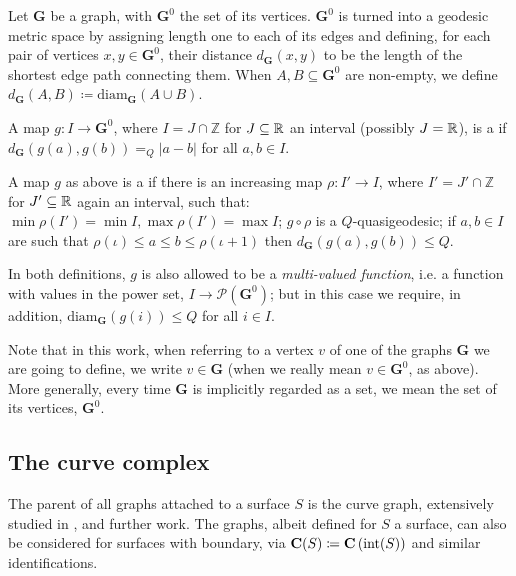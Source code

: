 Let $\mathbf G$ be a graph, with $\mathbf G^0$ the set of its vertices. $\mathbf G^0$ is turned into a geodesic metric space by assigning length one to each of its edges and defining, for each pair of vertices $x,y\in \mathbf G^0$, their distance $d_{\mathbf G}(x,y)$ to be the length of the shortest edge path connecting them. When $A,B \subseteq \mathbf G^0$ are non-empty, we define $d_{\mathbf G}(A,B)\coloneqq\mathrm{diam}_{\mathbf G} (A\cup B)$.

A map $g:I\rightarrow\mathbf G^0$, where $I=J\cap\mathbb Z$ for $J\subseteq \mathbb R$ an interval (possibly $J=\mathbb R$), is a  if $d_{\mathbf G}(g(a),g(b))=_Q |a-b|$ for all $a,b\in I$.

A map $g$ as above is a  if there is an increasing map $\rho:I'\rightarrow I$, where $I'=J'\cap \mathbb Z$ for $J'\subseteq \mathbb R$ again an interval, such that: $\min \rho(I')=\min I,\max \rho(I')=\max I$; $g\circ \rho$ is a $Q$-quasigeodesic; if $a,b\in I$ are such that $\rho(\iota)\leq a\leq b\leq \rho(\iota+1)$ then $d_{\mathbf G}(g(a),g(b))\leq Q$.

In both definitions, $g$ is also allowed to be a \emph{multi-valued function}, i.e. a function with values in the power set, $I\rightarrow \mathcal P(\mathbf G^0)$; but in this case we require, in addition, $\mathrm{diam}_{\mathbf G}(g(i))\leq Q$ for all $i\in I$.

Note that in this work, when referring to a vertex $v$ of one of the graphs $\mathbf G$ we are going to define, we write $v\in \mathbf G$ (when we really mean $v\in\mathbf G^0$, as above). More generally, every time $\mathbf G$ is implicitly regarded as a set, we mean the set of its vertices, $\mathbf G^0$.

\subsection{The curve complex}

The parent of all graphs attached to a surface $S$ is the curve graph, extensively studied in \cite{masurminskyi}, \cite{masurminskyii} and further work. The graphs, albeit defined for $S$ a surface, can also be considered for surfaces with boundary, via $\mathbf C(S)\coloneqq \mathbf C\left(\mathrm{int}(S)\right)$ and similar identifications.

